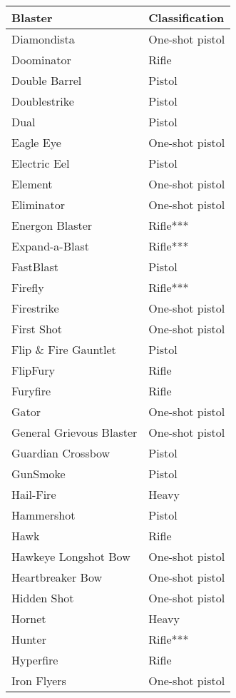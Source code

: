 \documentclass{scrbook}
\begin{document}
\begin{table}
\begin{tabular}{|l|l|} \hline 
Blaster & Classification \\
 \hline Diamondista & One-shot pistol \\
 \hline Doominator & Rifle \\
 \hline Double Barrel & Pistol \\
 \hline Doublestrike & Pistol \\
 \hline Dual & Pistol \\
 \hline Eagle Eye & One-shot pistol \\
 \hline Electric Eel & Pistol \\
 \hline Element & One-shot pistol \\
 \hline Eliminator & One-shot pistol \\
 \hline Energon Blaster & Rifle*** \\
 \hline Expand-a-Blast & Rifle*** \\
 \hline FastBlast & Pistol \\
 \hline Firefly & Rifle*** \\
 \hline Firestrike & One-shot pistol \\
 \hline First Shot & One-shot pistol \\
 \hline Flip \& Fire Gauntlet & Pistol \\
 \hline FlipFury & Rifle \\
 \hline Furyfire & Rifle \\
 \hline Gator & One-shot pistol \\
 \hline General Grievous Blaster & One-shot pistol \\
 \hline Guardian Crossbow & Pistol \\
 \hline GunSmoke & Pistol \\
 \hline Hail-Fire & Heavy \\
 \hline Hammershot & Pistol \\
 \hline Hawk & Rifle \\
 \hline Hawkeye Longshot Bow & One-shot pistol \\
 \hline Heartbreaker Bow & One-shot pistol \\
 \hline Hidden Shot & One-shot pistol \\
 \hline Hornet & Heavy \\
 \hline Hunter & Rifle*** \\
 \hline Hyperfire & Rifle \\
 \hline Iron Flyers & One-shot pistol \\

\end{tabular}
\end{table}
\end{document}
